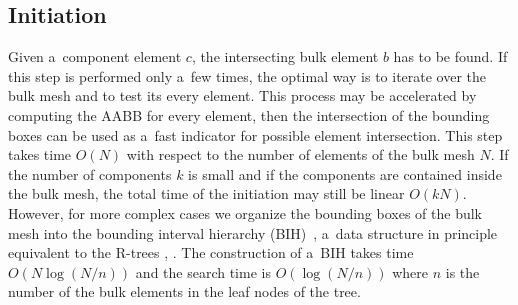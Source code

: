 
\subsection{Initiation}
\label{sec:initiation}
Given a~component element $c$, the intersecting bulk element $b$ has to be found.
If this step is performed only a~few times, the optimal way is to iterate over the bulk mesh and to test its every element.
This process may be accelerated by computing the AABB for every element, then the intersection of the bounding boxes can be used
as a~fast indicator for possible element intersection. This step takes time $O(N)$ with respect to the number of elements of the bulk mesh $N$.
If the number of components $k$ is small and if the components are contained inside the bulk mesh, the total time of the initiation 
may still be linear $O(kN)$. However, for more complex cases we organize the bounding boxes of the bulk mesh into the bounding interval
hierarchy (BIH)~\cite{wachter_instant_2006}, a~data structure in principle equivalent 
to the R-trees \cite{guttman_r_trees_1984}, \cite{nam_comparative_2004}. The construction of a~BIH takes time $O(N\log(N/n))$ 
and the search time is $O(\log(N/n))$ where $n$ is the number of the bulk elements in the leaf nodes of the tree.
 
